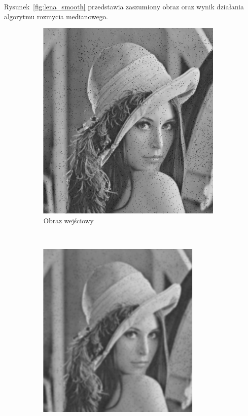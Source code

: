 Rysunek~\ref{fig:lena_smooth} przedstawia zaszumiony obraz oraz wynik działania algorytmu rozmycia medianowego.
\begin{figure}
  \centering
  \begin{subfigure}[b]{0.45\textwidth}
    \includegraphics[width=\textwidth]{img/smooth-lena-input}
    \caption{Obraz wejściowy}
    \label{fig:smooth_lena_input}
  \end{subfigure}
  ~
  \begin{subfigure}[b]{0.45\textwidth}
    \includegraphics[width=\textwidth]{img/smooth-lena-gauss}

\end{subfigure}
\end{figure}
